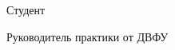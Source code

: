 \vspace{10pt}

\begin{multicols}{2}

    Студент

    Руководитель практики от ДВФУ

    \columnbreak

    \hspace*{-1cm} 

    \hspace*{-1cm} 


\end{multicols}


\pagebreak